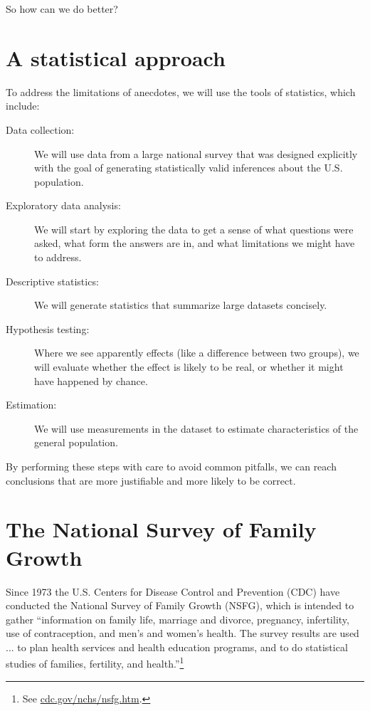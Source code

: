 \documentclass[10pt]{book}
\begin{document}
So how can we do better?

\section{A statistical approach}

To address the limitations of anecdotes, we will use the tools
of statistics, which include:

\begin{description}

\item[Data collection:] We will use data from a large national survey
that was designed explicitly with the goal of generating statistically
valid inferences about the U.S. population.

\item[Exploratory data analysis:] We will start by exploring the data
to get a sense of what questions were asked, what form the answers
are in, and what limitations we might have to address.

\item[Descriptive statistics:] We will generate statistics that summarize
large datasets concisely.

\item[Hypothesis testing:] Where we see apparently effects (like a
difference between two groups), we will evaluate whether the effect
is likely to be real, or whether it might have happened by chance.

\item[Estimation:] We will use measurements in the dataset to estimate
characteristics of the general population.

\end{description}

By performing these steps with care to avoid common pitfalls, we can
reach conclusions that are more justifiable and more likely to be
correct.


\section{The National Survey of Family Growth}

Since 1973 the U.S. Centers for Disease Control and Prevention (CDC)
have conducted the National Survey of Family Growth (NSFG),
which is intended to gather ``information on family life, marriage and
divorce, pregnancy, infertility, use of contraception, and men's and
women's health. The survey results are used ... to plan health services and
health education programs, and to do statistical studies of families,
fertility, and health.''\footnote{See
  \url{cdc.gov/nchs/nsfg.htm}.}
\end{document}

